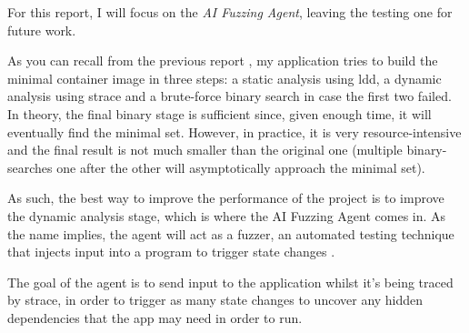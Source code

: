 For this report, I will focus on the \textit{AI Fuzzing Agent}, leaving the testing one for future work.

As you can recall from the previous report \cite{report1}, my application tries to build the minimal container image in three steps:
a static analysis using ldd, a dynamic analysis using strace and a brute-force binary search in case the first two failed. In theory,
the final binary stage is sufficient since, given enough time, it will eventually find the minimal set. However, in practice, it is very resource-intensive
and the final result is not much smaller than the original one (multiple binary-searches one after the other will asymptotically approach the minimal set).

As such, the best way to improve the performance of the project is to improve the dynamic analysis stage, which is where the AI Fuzzing Agent comes in.
As the name implies, the agent will act as a fuzzer, an automated testing technique that injects input into a program to trigger state changes \cite{fuzzing}.


The goal of the agent is to send input to the application whilst it's being traced by strace, in order to trigger as many state changes to uncover any hidden dependencies that
the app may need in order to run.